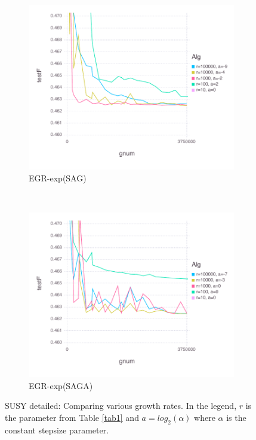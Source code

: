 \documentclass[11pt]{article}
\begin{document}
\begin{figure}[H]
          \begin{subfigure}[b]{0.45\textwidth}
              \includegraphics[width=\textwidth]{Figures/SUSYBLtrueffFinal-expfalse.pdf}
              \caption{EGR-exp(SAG)}
          \end{subfigure}
          ~ %
            \begin{subfigure}[b]{0.45\textwidth}
                \includegraphics[width=\textwidth]{Figures/SUSYBLtrueffFinal-exptrue.pdf}
                \caption{EGR-exp(SAGA)}
            \end{subfigure}
          \caption{SUSY detailed: Comparing various growth rates. In the legend, $r$ is the parameter from Table \ref{tab1} and $a=log_2(\alpha)$ where $\alpha$ is the constant stepsize parameter.}\label{fig:SUSY}
      \end{figure}
   
\end{document}
